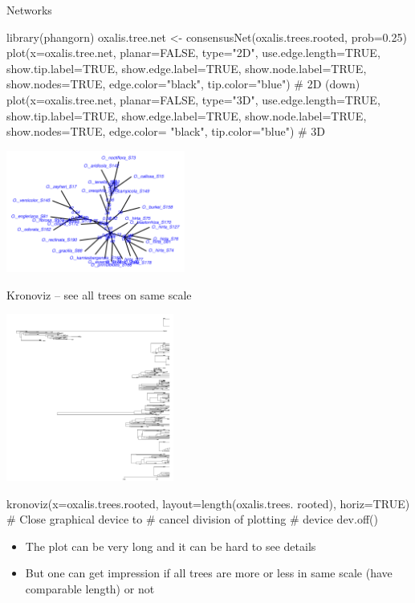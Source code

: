 \documentclass[compress, ucs, xelatex, 11pt, xcolor=svgnames,
  hyperref={
    bookmarks=true,
    unicode=true,
    colorlinks=true,
    pdftitle={Molecular data in R},
    plainpages=false,
    pdfauthor={Vojtech Zeisek},
    pdfsubject={Course about phylogeny and evolution in R},
    pdfcreator={XeLaTeX},
    pdfkeywords={R, evolution, phylogeny, molecular data},
    linkcolor=Tomato,
    anchorcolor=SaddleBrown,
    citecolor=Goldenrod,
    filecolor=DarkMagenta,
    menucolor=Sienna,
    urlcolor=DarkTurquoise,
    pdftex},
  url={hyphens, lowtilde} %
  ]{beamer}
\begin{document}
\begin{frame}[fragile]{Networks}
  \begin{spluscode}
    library(phangorn)
    oxalis.tree.net <- consensusNet(oxalis.trees.rooted, prob=0.25)
    plot(x=oxalis.tree.net, planar=FALSE, type="2D", use.edge.length=TRUE,
      show.tip.label=TRUE, show.edge.label=TRUE, show.node.label=TRUE,
      show.nodes=TRUE, edge.color="black", tip.color="blue") # 2D (down)
    plot(x=oxalis.tree.net, planar=FALSE, type="3D", use.edge.length=TRUE,
      show.tip.label=TRUE, show.edge.label=TRUE, show.node.label=TRUE,
      show.nodes=TRUE, edge.color= "black", tip.color="blue") # 3D
  \end{spluscode}
  \begin{center}
    \includegraphics[height=4cm]{oxalis-net.png}
  \end{center}
\end{frame}

\begin{frame}[fragile]{Kronoviz -- see all trees on same scale}
\begin{multicols}{2}
  \includegraphics[height=5.5cm]{kronoviz.png}
  \begin{spluscode}
    kronoviz(x=oxalis.trees.rooted,
      layout=length(oxalis.trees.
      rooted), horiz=TRUE)
    # Close graphical device to
    # cancel division of plotting
    # device
    dev.off()
  \end{spluscode}
  \vfill
  \begin{itemize}
    \item The plot can be very long and it can be hard to see details
    \item But one can get impression if all trees are more or less in same scale (have comparable length) or not
  \end{itemize}
  \vfil
\end{multicols}
\end{frame}
\end{document}

